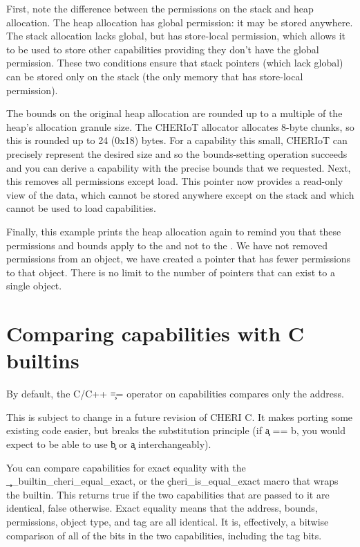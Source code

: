 {{{{{{{{First, note the difference between the permissions on the stack and heap allocation.
The heap allocation has global permission: it may be stored anywhere.
The stack allocation lacks global, but has store-local permission, which allows it to be used to store other capabilities providing they don't have the global permission.
These two conditions ensure that stack pointers (which lack global) can be stored only on the stack (the only memory that has store-local permission).

The bounds on the original heap allocation are rounded up to a multiple of the heap's allocation granule size.
The CHERIoT allocator allocates 8-byte chunks, so this is rounded up to 24 (0x18) bytes.
For a capability this small, CHERIoT can precisely represent the desired size and so the bounds-setting operation succeeds and you can derive a capability with the precise bounds that we requested.
Next, this removes all permissions except load.
This pointer now provides a read-only view of the data, which cannot be stored anywhere except on the stack and which cannot be used to load capabilities.

Finally, this example prints the heap allocation again to remind you that these permissions and bounds apply to the  and not to the .
We have not removed permissions from an object, we have created a pointer that has fewer permissions to that object.
There is no limit to the number of pointers that can exist to a single object.

\section{Comparing capabilities with C builtins}

By default, the C/C++ \c{==} operator on capabilities compares only the address.

\begin{note}
	This is subject to change in a future revision of CHERI C.
	It makes porting some existing code easier, but breaks the substitution principle (if \c{a == b}, you would expect to be able to use \c{b} or \c{a} interchangeably).
\end{note}

You can compare capabilities for exact equality with the \c{__builtin_cheri_equal_exact}, or the \c{cheri_is_equal_exact} macro that wraps the builtin.
This returns true if the two capabilities that are passed to it are identical, false otherwise.
Exact equality means that the address, bounds, permissions, object type, and tag are all identical.
It is, effectively, a bitwise comparison of all of the bits in the two capabilities, including the tag bits.

}}}}}}}}
